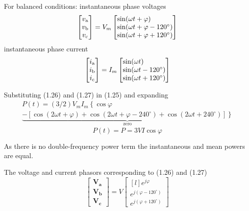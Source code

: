 \documentclass[a4paper,numbers=noenddot,12pt]{scrbook}
\begin{document}
For balanced conditions: instantaneous phase voltages
\begin{equation}
    \begin{bmatrix}
        v_\textup{a} \\ v_\textup{b} \\ v_\textup{c}
    \end{bmatrix}
    = V_m
    \begin{bmatrix*}[l]
        \sin(\omega t + \varphi) \\
        \sin(\omega t + \varphi - 120^\circ )\\
        \sin(\omega t + \varphi + 120^\circ )
    \end{bmatrix*}
    \label{eq:Eq1.26}
\end{equation}
instantaneous phase current
\begin{equation}
    \begin{bmatrix}
        i_\textup{a} \\ i_\textup{b} \\ i_\textup{c}
    \end{bmatrix}
    = I_m
    \begin{bmatrix*}[l]
        \sin(\omega t ) \\
        \sin(\omega t - 120^\circ )\\
        \sin(\omega t + 120^\circ )
    \end{bmatrix*}
    \label{eq:Eq1.27}
\end{equation}

Substituting (1.26) and (1.27) in (1.25) and expanding
\begin{multline*}
    P(t) = (3/2) V_m I_m \left\{\cos \varphi \right. \\
        \underbrace{\left.-[\cos (2 \omega t + \varphi) + \cos (2\omega t + \varphi - 240^\circ) + \cos (2 \omega t +240^\circ)]\right\}}_{\text{zero}}
\end{multline*}
\begin{equation}
    P(t) = P = 3 V I \cos \varphi
    \label{eq:Eq1.28}
\end{equation}

As there is no double-frequency power term the instantaneous and mean powers are equal.

The voltage and current phasors corresponding to (1.26) and (1.27)
\begin{equation}
    \begin{bmatrix}
       \mathbf{V_a} \\ \mathbf{V_b} \\ \mathbf{V_c}
    \end{bmatrix}
    = V
    \begin{bmatrix*}[l]
        e^{j \varphi} \\ e^{j (\varphi - 120^\circ)} \\ e^{j (\varphi + 120^\circ)}
    \end{bmatrix*}
    \label{eq:Eq1.29}
\end{equation}
\end{document}
